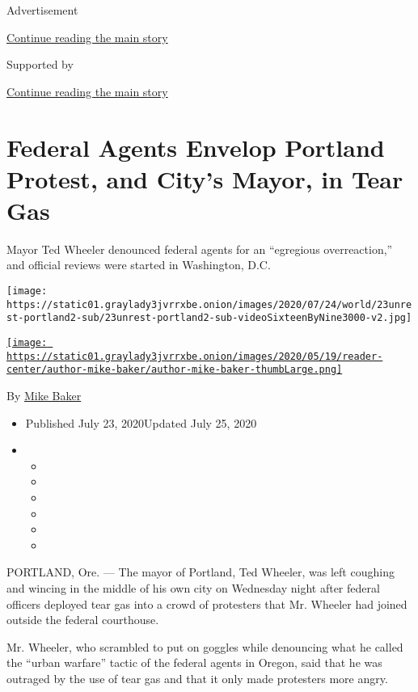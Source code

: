 Advertisement

\protect\hyperlink{after-top}{Continue reading the main story}

Supported by

\protect\hyperlink{after-sponsor}{Continue reading the main story}

\hypertarget{federal-agents-envelop-portland-protest-and-citys-mayor-in-tear-gas}{%
\section{Federal Agents Envelop Portland Protest, and City's Mayor, in
Tear
Gas}\label{federal-agents-envelop-portland-protest-and-citys-mayor-in-tear-gas}}

Mayor Ted Wheeler denounced federal agents for an ``egregious
overreaction,'' and official reviews were started in Washington, D.C.

\texttt{[image: https://static01.graylady3jvrrxbe.onion/images/2020/07/24/world/23unrest-portland2-sub/23unrest-portland2-sub-videoSixteenByNine3000-v2.jpg]}

\href{https://www.nytimes3xbfgragh.onion/by/mike-baker}{\texttt{[image: https://static01.graylady3jvrrxbe.onion/images/2020/05/19/reader-center/author-mike-baker/author-mike-baker-thumbLarge.png]}}

By \href{https://www.nytimes3xbfgragh.onion/by/mike-baker}{Mike Baker}

\begin{itemize}
\item
  Published July 23, 2020Updated July 25, 2020
\item
  \begin{itemize}
  \item
  \item
  \item
  \item
  \item
  \item
  \end{itemize}
\end{itemize}

PORTLAND, Ore. --- The mayor of Portland, Ted Wheeler, was left coughing
and wincing in the middle of his own city on Wednesday night after
federal officers deployed tear gas into a crowd of protesters that Mr.
Wheeler had joined outside the federal courthouse.

Mr. Wheeler, who scrambled to put on goggles while denouncing what he
called the ``urban warfare'' tactic of the federal agents in Oregon,
said that he was outraged by the use of tear gas and that it only made
protesters more angry.

